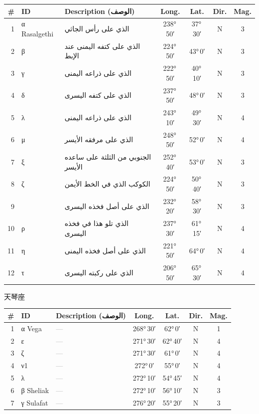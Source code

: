 \documentclass[9pt,a4paper]{extarticle}
\newcommand{\ar}[1]{{\arabicfont\textarabic{#1}}}
\begin{document}
\begin{longtable}{r l >{\raggedright\arraybackslash}p{6.7cm} c c c c}
\toprule \# & ID & Description (\ar{الوصف}) & Long. & Lat. & Dir. & Mag.\\ \midrule\endhead
1 & α Rasalgethi & \ar{الذي على رأس الجاثي} & 238°\,50′ & 37°\,30′ & N & 3\\
2 & β & \ar{الذي على كتفه اليمنى عند الإبط} & 224°\,50′ & 43°\,0′ & N & 3\\
3 & γ & \ar{الذي على ذراعه اليمنى} & 222°\,50′ & 40°\,10′ & N & 3\\
4 & δ & \ar{الذي على كتفه اليسرى} & 237°\,50′ & 48°\,0′ & N & 3\\
5 & λ & \ar{الذي على ذراعه اليمنى} & 243°\,10′ & 49°\,30′ & N & 4\\
6 & μ & \ar{الذي على مرفقه الأيسر} & 248°\,50′ & 52°\,0′ & N & 4\\
7 & ξ & \ar{الجنوبي من الثلثة على ساعده الأيسر} & 252°\,40′ & 53°\,0′ & N & 3\\
8 & ζ & \ar{الكوكب الذي في الخط الأيمن} & 224°\,50′ & 50°\,40′ & N & 3\\
9 &  & \ar{الذي على أصل فخذه اليسرى} & 232°\,20′ & 58°\,30′ & N & 3\\
10 & ρ & \ar{الذي تلو هذا في فخذه اليسرى} & 237°\,30′ & 61°\,15′ & N & 4\\
11 & η & \ar{الذي على أصل فخذه اليمنى} & 221°\,50′ & 64°\,0′ & N & 4\\
12 & τ & \ar{الذي على ركبته اليسرى} & 206°\,50′ & 65°\,30′ & N & 4\\
\bottomrule\end{longtable}
\vspace{4pt}\quad\ar{النسر الواقع}\quad 天琴座
\begin{longtable}{r l >{\raggedright\arraybackslash}p{6.7cm} c c c c}
\toprule \# & ID & Description (\ar{الوصف}) & Long. & Lat. & Dir. & Mag.\\ \midrule\endhead
1 & α Vega & \textcolor{gray}{—} & 268°\,30′ & 62°\,0′ & N & 1\\
2 & ε & \textcolor{gray}{—} & 271°\,30′ & 62°\,40′ & N & 4\\
3 & ζ & \textcolor{gray}{—} & 271°\,30′ & 61°\,0′ & N & 4\\
4 & ν1 & \textcolor{gray}{—} & 272°\,0′ & 55°\,0′ & N & 4\\
5 & λ & \textcolor{gray}{—} & 272°\,10′ & 54°\,45′ & N & 4\\
6 & β Sheliak & \textcolor{gray}{—} & 272°\,10′ & 56°\,10′ & N & 3\\
7 & γ Sulafat & \textcolor{gray}{—} & 276°\,20′ & 55°\,20′ & N & 3\\
\bottomrule\end{longtable}
\end{document}
